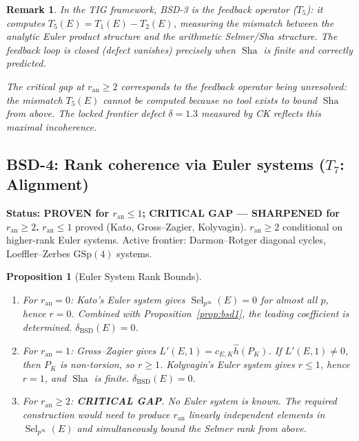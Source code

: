 \documentclass[11pt]{article}
\newtheorem{proposition}[theorem]{Proposition}
\newtheorem{remark}[theorem]{Remark}
\DeclareMathOperator{\Sha}{Sha}
\DeclareMathOperator{\Sel}{Sel}
\begin{document}
\begin{remark}
\label{rem:T5-feedback}
In the TIG framework, BSD-3 is the \emph{feedback operator} ($T_5$): it
computes $T_5(E) = T_1(E) - T_2(E)$, measuring the mismatch between the
analytic Euler product structure and the arithmetic Selmer/Sha structure.
The feedback loop is closed (defect vanishes) precisely when $\Sha$ is finite
and correctly predicted.

The critical gap at $r_{\mathrm{an}} \geq 2$ corresponds to the feedback
operator being \emph{unresolved}: the mismatch $T_5(E)$ cannot be computed
because no tool exists to bound $\Sha$ from above.  The locked frontier defect
$\delta = 1.3$ measured by CK reflects this maximal incoherence.
\end{remark}

\subsection{BSD-4: Rank coherence via Euler systems ($T_7$: Alignment)}

\textbf{Status: PROVEN for $r_{\mathrm{an}} \leq 1$; CRITICAL GAP --- SHARPENED
for $r_{\mathrm{an}} \geq 2$.}  $r_{\mathrm{an}} \leq 1$ proved
(Kato, Gross--Zagier, Kolyvagin).  $r_{\mathrm{an}} \geq 2$ conditional on
higher-rank Euler systems.  Active frontier: Darmon--Rotger diagonal cycles,
Loeffler--Zerbes $\mathrm{GSp}(4)$ systems.

\begin{proposition}[Euler System Rank Bounds]
\label{prop:bsd4}
\leavevmode
\begin{enumerate}
  \item For $r_{\mathrm{an}} = 0$: Kato's Euler system \cite{Kato} gives
    $\Sel_{p^\infty}(E) = 0$ for almost all $p$, hence $r = 0$.  Combined with
    Proposition~\ref{prop:bsd1}, the leading coefficient is determined.
    $\delta_{\mathrm{BSD}}(E) = 0$.

  \item For $r_{\mathrm{an}} = 1$: Gross--Zagier \cite{GZ} gives
    $L'(E,1) = c_{E,K} \hat{h}(P_K)$.  If $L'(E,1) \neq 0$, then $P_K$ is
    non-torsion, so $r \geq 1$.  Kolyvagin's Euler system \cite{Koly} gives
    $r \leq 1$, hence $r = 1$, and $\Sha$ is finite.
    $\delta_{\mathrm{BSD}}(E) = 0$.

  \item For $r_{\mathrm{an}} \geq 2$: \textbf{CRITICAL GAP}.  No Euler system
    is known.  The required construction would need to produce $r_{\mathrm{an}}$
    linearly independent elements in $\Sel_{p^\infty}(E)$ and simultaneously
    bound the Selmer rank from above.
\end{enumerate}
\end{proposition}
\end{document}
